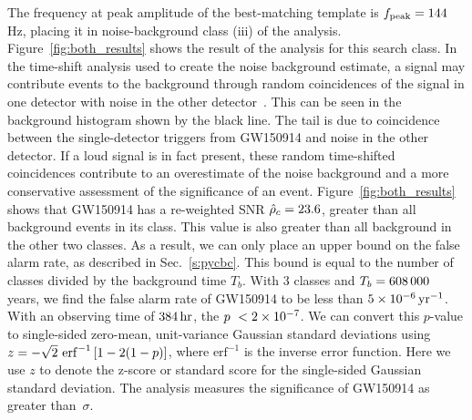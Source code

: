 The frequency at peak amplitude of the best-matching template is
$f_{\mathrm{peak}} = 144\,$Hz, placing it in
noise-background class (iii) of the \pycbc{} analysis.
Figure~\ref{fig:both_results} shows the result of the \pycbc{} analysis
for this search class.  In the time-shift analysis used to create the noise
background estimate, a signal may contribute events
to the background through random coincidences of the signal in one
detector with noise in the other detector~\cite{Capano:2016uif}.  This can be
seen in the background histogram shown by the black line. The tail is due
to coincidence between the single-detector triggers from GW150914 and noise in
the other detector.  If a loud signal is in fact present, these random
time-shifted coincidences contribute to an overestimate of the noise
background and a more conservative assessment of the significance of an event.
Figure~\ref{fig:both_results} shows that GW150914 has a re-weighted SNR
$\hat{\rho}_c = 23.6$, greater than all background events in its
class. This value is also greater than all background in the other two
classes. As a result, we can only place an upper bound on the false alarm
rate, as described in Sec.~\ref{s:pycbc}. This bound is equal to the number of
classes divided by the background time $T_b$. With $3$ classes and $T_b =
608\,000$ years, we find the false alarm rate of GW150914 to be less
than $5 \times 10^{-6}\,\text{yr}^{-1}$. With an observing time of $384\,\mathrm{hr}$,
the $p~< 2\times 10^{-7}$.  We can convert this
$p$-value to single-sided zero-mean, unit-variance Gaussian standard deviations
using $z=-\sqrt{2}\ \mathrm{erf}^{-1}\left[1 - 2(1-p)\right]$, where
$\mathrm{erf}^{-1}$ is the inverse error function. Here we use $z$
to denote the z-score or standard score for the single-sided
Gaussian standard deviation. The \pycbc{} analysis
measures the significance of GW150914 as greater than \CBCEVENTSIGMA
$\,\sigma$.

